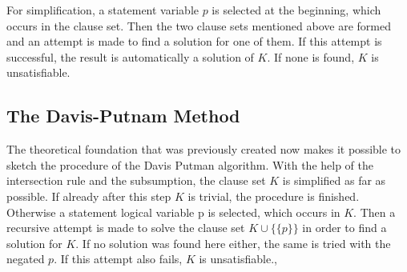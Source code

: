 For simplification, a statement variable $p$ is selected at the beginning, which occurs in the clause set. Then the two clause sets mentioned above are formed and an attempt is made to find a solution for one of them. If this attempt is successful, the result is automatically a solution of $K$. If none is found, $K$ is unsatisfiable.

\subsection{The Davis-Putnam Method}
\label{sub:sciDavisPutnamMethod}
The theoretical foundation that was previously created now makes it possible to sketch the procedure of the Davis Putman algorithm. With the help of the intersection rule and the subsumption, the clause set $K$ is simplified as far as possible. If already after this step $K$ is trivial, the procedure is finished. Otherwise a statement logical variable p is selected, which occurs in $K$. Then a recursive attempt is made to solve the clause set $K \cup \bigl\{\{p\}\bigr\}$ in order to find a solution for $K$. If no solution was found here either, the same is tried with the negated $p$. If this attempt also fails, $K$ is unsatisfiable.\cite{Zhang2000}, \cite{Stroetman2019}

